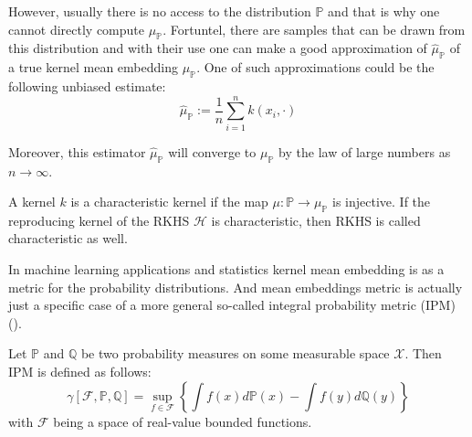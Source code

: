 However, usually there is no access to the distribution $\mathds{P}$ and that is why one cannot directly compute $\mu_{\mathds{P}}$. Fortuntel, there are samples that can be drawn from this distribution and with their use one can make a good approximation of $\hat{\mu}_{\mathds{P}}$ of a true kernel mean embedding $\mu_{\mathds{P}}$. One of such approximations could be the following unbiased estimate:
\begin{equation}
    \hat{\mu}_{\mathds{P}} := \frac{1}{n} \sum_{i=1}^n k(x_i, \cdot)
\end{equation}

Moreover, this estimator $\hat{\mu}_{\mathds{P}}$  will converge to $\mu_{\mathds{P}}$ by the law of large numbers as $n \rightarrow \infty$.

\begin{definition}
    A kernel $k$ is a characteristic kernel if the map $\mu: \mathds{P} \rightarrow \mu_{\mathds{P}}$ is injective. If the reproducing kernel of the RKHS $\mathscr{H}$ is characteristic, then RKHS is called characteristic as well. 
\end{definition}

In machine learning applications and statistics kernel mean embedding is as a metric for the probability distributions. And mean embeddings metric is actually just a specific case of a more general so-called integral probability metric (IPM) (\cite{Mueller_1997}).

\begin{definition}[IPM]
    Let $\mathds{P}$ and  $\mathds{Q}$ be two probability measures on some measurable space $\mathcal{X}$. Then IPM is defined as follows:
    \begin{equation}
        \gamma [\mathcal{F}, \mathds{P}, \mathds{Q}] = \sup_{f\in \mathcal{F}} \left\{ \int f(x) d\mathds{P}(x) -  \int f(y) d\mathds{Q}(y) \right\}
    \label{eq:ipm}
    \end{equation}
    with $\mathcal{F}$ being a space of real-value bounded functions.
\end{definition}